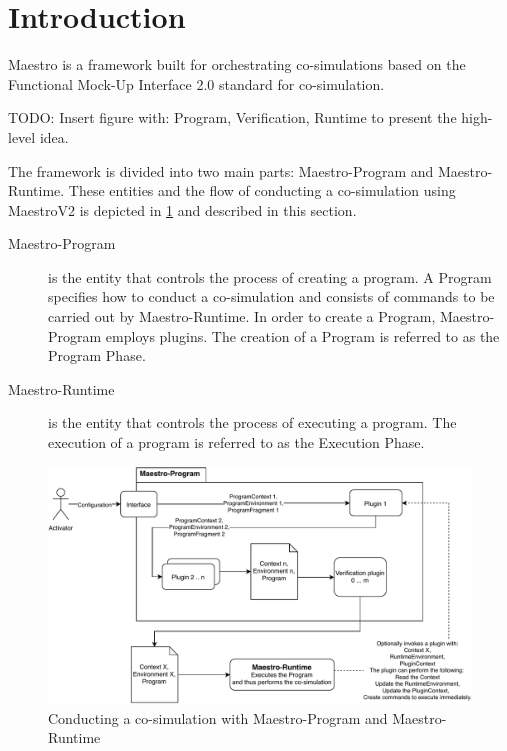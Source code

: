 \section{Introduction}\label{sec:intro}

Maestro is a framework built for orchestrating co-simulations based on the
Functional Mock-Up Interface 2.0 standard for co-simulation.

TODO: Insert figure with: Program, Verification, Runtime to present the
high-level idea.

The framework is divided into two main parts: Maestro-Program and
Maestro-Runtime. These entities and the flow of conducting a co-simulation using
MaestroV2 is depicted in \cref{fig:conducting_co-simulation-overview} and
described in this section.

\begin{description}
  \item[Maestro-Program] is the entity that controls the process of creating a
program. A Program specifies how to conduct a co-simulation and consists of
commands to be carried out by Maestro-Runtime. In order to create a Program,
Maestro-Program employs plugins. The creation of a Program is referred to as the
Program Phase.
  \item[Maestro-Runtime] is the entity that controls the process of executing a
program. The execution of a program is referred to as the Execution Phase.

\end{description}
\begin{figure}[htb] \centering
\includegraphics[width=\textwidth]{figures/conducting_co-simulation_overview.pdf}
  \caption{Conducting a co-simulation with Maestro-Program and Maestro-Runtime}
  \label{fig:conducting_co-simulation-overview}
\end{figure}

